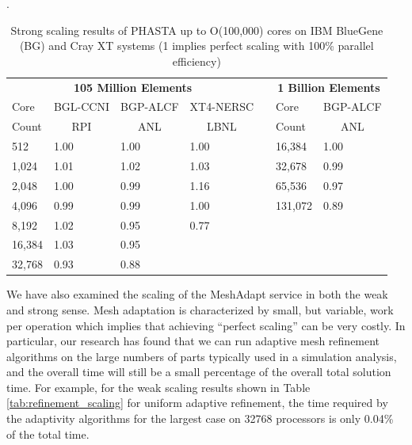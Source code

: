 \documentclass[letterpaper]{jpconf}
\begin{document}
\begin{table}[htbp]
\begin{center}
\caption{Strong scaling results of PHASTA up to O(100,000) cores on IBM BlueGene (BG)
and Cray XT systems (1 implies perfect scaling with 100\% parallel efficiency)}.
\label{tab:scaling}
\begin{footnotesize}
\begin{tabular}{|l|l|l|l|c|l|l|}
\cline{1-4}  
\cline{6-7}
\multicolumn{4}{|c|}{\bf 105 Million Elements} & &
\multicolumn{2}{|c|}{\bf 1 Billion Elements} \\
\cline{1-4}  
\cline{6-7}
Core &  BGL-CCNI  & BGP-ALCF & XT4-NERSC&  &  Core &   BGP-ALCF \\
Count  & \multicolumn{1}{|c|}{RPI} & \multicolumn{1}{|c|}{ANL} &     \multicolumn{1}{|c|}{LBNL} &       &  Count   & \multicolumn{1}{|c|}{ANL} \\
\cline{1-4}  
\cline{6-7}
512    &   	1.00   &       	1.00 &    1.00   & &  16,384   &	1.00 \\
1,024  & 	1.01   &       	1.02 &    1.03   & &  32,678   &	0.99  \\
2,048  &	1.00   &       	0.99 &    1.16   & &  65,536   &	0.97 \\
4,096  &  	0.99   &       	0.99 &    1.00   & &  131,072  & 	0.89 \\
\cline{6-7}
8,192  & 	1.02   &       	0.95 &    0.77   &  \multicolumn{3}{c}{}  \\
16,384 &	1.03   &       	0.95 &           &  \multicolumn{3}{c}{}  \\
32,768 & 	0.93   &       	0.88 &           &  \multicolumn{3}{c}{}  \\
\cline{1-4}  
\end{tabular}
\end{footnotesize}
\end{center}
\end{table}

We have also examined the scaling of the MeshAdapt service in both the
weak and strong sense.  Mesh adaptation is characterized by small, but
variable, work per operation which implies that achieving ``perfect
scaling'' can be very costly.  In particular, our research has found that
we can run adaptive mesh refinement algorithms on the large numbers of
parts typically used in a simulation analysis, and the overall time
will still be a small percentage of the overall total solution time.
For example, for the weak scaling results shown in Table
\ref{tab:refinement_scaling} for uniform adaptive refinement, the time 
required by the adaptivity algorithms for the largest case on 32768
processors is only 0.04\% of the total time.
\end{document}
